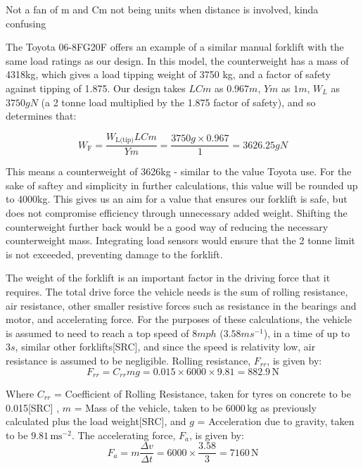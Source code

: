 \documentclass[12pt]{article}
\begin{document}
Not a fan of m and Cm not being units when distance is involved, kinda confusing

The Toyota 06-8FG20F \cite{Toyota} offers an example of a similar manual forklift with the same load ratings as our design. In this model, the counterweight has a mass of 4318kg, which gives a load tipping weight of 3750 kg, and a factor of safety against tipping of 1.875. Our design takes $LCm$ as $0.967m$, $Ym$ as $1m$, $W_L$ as $3750gN$ (a 2 tonne load multiplied by the 1.875 factor of safety), and so determines that:

\vspace{-10pt}
\begin{equation}
    W_{\text{F}} = \frac{W_{\text{L(tip)}}LCm}{Ym} = \frac{3750g \times 0.967}{1} = 3626.25gN
\end{equation}
\vspace{-35pt}

This means a counterweight of 3626kg - similar to the value Toyota use. For the sake of saftey and simplicity in further calculations, this value will be rounded up to 4000kg. This gives us an aim for a value that ensures our forklift is safe, but does not compromise efficiency through unnecessary added weight. Shifting the  counterweight further back would be a good way of reducing the necessary counterweight mass. Integrating load sensors would ensure that the 2 tonne limit is not exceeded, preventing damage to the forklift.

The weight of the forklift is an important factor in the driving force that it requires. The total drive force the vehicle needs is the sum of rolling resistance, air resistance, other smaller resistive forces such as resistance in the bearings and motor, and accelerating force. For the purposes of these calculations, the vehicle is assumed to need to reach a top speed of $8mph$ ($3.58ms^{-1}$), in a time of up to $3s$, similar other forklifts[SRC], and since the speed is relativity low, air resistance is assumed to be negligible. Rolling resistance, $F_{rr}$, is given by:
\vspace{-20pt}
\begin{equation}
    F_{rr} = C_{rr} m g = 0.015 \times 6000 \times 9.81 =  882.9 \, \text{N}
\end{equation}

Where \( C_{rr} \) = Coefficient of Rolling Resistance, taken for tyres on concrete to be 0.015[SRC] \cite{RollingResistance}, \( m \) = Mass of the vehicle, taken to be \( 6000 \, \text{kg} \) as previously calculated plus the load weight[SRC], and \( g \) = Acceleration due to gravity, taken to be \( 9.81 \, \text{ms}^{-2} \). The accelerating force, \( F_a \), is given by:
\vspace{-20pt}
\begin{equation}
    F_a = m\frac{\Delta v}{\Delta t} = 6000\times \frac{3.58}{3} = 7160 \, \text{N}
\end{equation}
\end{document}
